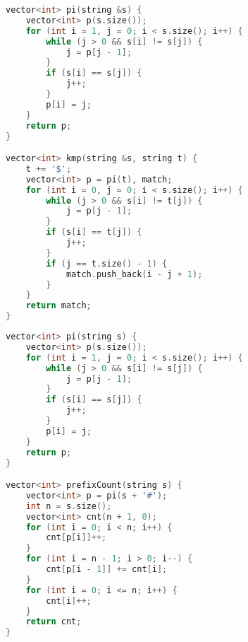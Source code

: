 \documentclass[11pt, a4paper, oneside]{book}
\begin{document}
\hfill

\begin{multicols}{2}
\begin{lstlisting}[language=C++]
vector<int> pi(string &s) {
    vector<int> p(s.size());
    for (int i = 1, j = 0; i < s.size(); i++) {
        while (j > 0 && s[i] != s[j]) {
            j = p[j - 1];
        }
        if (s[i] == s[j]) {
            j++;
        }
        p[i] = j;
    }
    return p;
}

vector<int> kmp(string &s, string t) {
    t += '$';
    vector<int> p = pi(t), match;
    for (int i = 0, j = 0; i < s.size(); i++) {
        while (j > 0 && s[i] != t[j]) {
            j = p[j - 1];
        }
        if (s[i] == t[j]) {
            j++;
        }
        if (j == t.size() - 1) {
            match.push_back(i - j + 1);
        }
    }
    return match;
}
\end{lstlisting}
\end{multicols}

\hfill

\begin{multicols}{2}
\begin{lstlisting}[language=C++]
vector<int> pi(string s) {
    vector<int> p(s.size());
    for (int i = 1, j = 0; i < s.size(); i++) {
        while (j > 0 && s[i] != s[j]) {
            j = p[j - 1];
        }
        if (s[i] == s[j]) {
            j++;
        }
        p[i] = j;
    }
    return p;
}

vector<int> prefixCount(string s) {
    vector<int> p = pi(s + '#');
    int n = s.size();
    vector<int> cnt(n + 1, 0);
    for (int i = 0; i < n; i++) {
        cnt[p[i]]++;
    }
    for (int i = n - 1; i > 0; i--) {
        cnt[p[i - 1]] += cnt[i];
    }
    for (int i = 0; i <= n; i++) {
        cnt[i]++;
    }
    return cnt;
}\end{lstlisting}
\end{multicols}

\hfill
\end{document}

